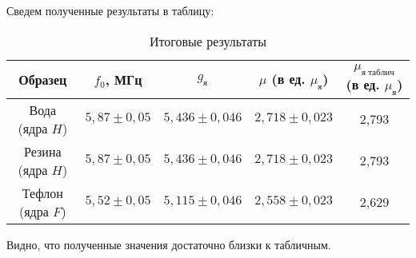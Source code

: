 \documentclass[12pt]{kiarticle}
\begin{document}
	Сведем полученные результаты в таблицу:
	
	
	\begin{table}[h!]
		\caption{Итоговые результаты}
		\begin{center}
			\begin{tabular}{|c|c|c|c|c|}
				\hline
				Образец  & $ f_0 $, МГц &$ g_я $  & $ \mu $ (в ед. $ \mu_я $) & $ \mu_{я\; таблич} $ (в ед. $ \mu_я $) \\ \hline
				Вода (ядра $ H $)  & $ 5,87 \pm 0,05 $ &   $ 5,436 \pm 0,046 $   &  $ 2,718 \pm 0,023 $  & 2,793 \\
				Резина (ядра $ H $)  & $ 5,87 \pm 0,05 $ &   $ 5,436 \pm 0,046 $   &  $ 2,718 \pm 0,023 $  & 2,793 \\
				Тефлон (ядра $ F $)  & $ 5,52 \pm 0,05 $ &   $ 5,115 \pm 0,046 $   &  $ 2,558 \pm 0,023 $  & 2,629 \\
				 \hline
			\end{tabular}
		\end{center}
		\label{table_5}
	\end{table}

	Видно, что полученные значения достаточно близки к табличным. 
	
\end{document}
